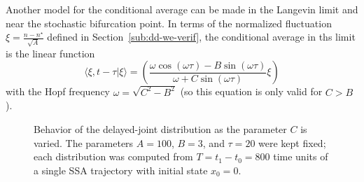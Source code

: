 \documentclass[english,letterpaper,12pt]{report}
\begin{document}
\begin{doublespacing}


Another model for the conditional average can be made in the Langevin limit and near the stochastic bifurcation point. In terms of the normalized fluctuation $\xi = \frac{n - n^\star}{\sqrt{A}}$ defined in Section~\ref{sub:dd-we-verif}, the conditional average in ths limit is the linear function \cite{delayed-deg-notes}
\begin{equation}
    \langle \xi, t - \tau | \xi \rangle = \left( \frac{\omega \cos(\omega \tau) - B \sin(\omega \tau)}{\omega + C \sin(\omega \tau)}\xi \right)
    \label{eq:cond-avg-linear}
\end{equation}
with the Hopf frequency $\omega = \sqrt{C^2 - B^2}$ (so this equation is only valid for $C > B$).

\begin{figure}[htb]
    \caption{Behavior of the delayed-joint distribution as the parameter $C$ is varied. The parameters $A=100$, $B=3$, and $\tau=20$ were kept fixed; each distribution was computed from $T = t_1 - t_0 = 800$ time units of a single SSA trajectory with initial state $x_0 = 0$.}
\end{figure}


\end{doublespacing}
\end{document}
